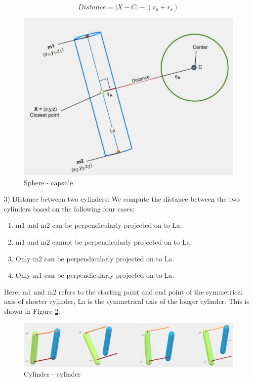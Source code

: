 \documentclass[a4paper, 11.5pt, conference]{ieeeconf}      %
\begin{document}
\begin{equation}
	Distance = |X-C| - (r_a + r_s)
\end{equation}

\begin{figure}[H]
    \centering
    \includegraphics[scale=0.3]{images/sphere_capsule.png}
    \caption{Sphere - capsule}
    \label{fig:spherecapsule}
\end{figure}

3) Distance between two cylinders:
We compute the distance between the two cylinders based on the following four cases:
\begin{enumerate}
	\item m1 and m2 can be perpendicularly projected on to La.
	\item m1 and m2 cannot be perpendicularly projected on to La.
	\item Only m2 can be perpendicularly projected on to La.
	\item Only m1 can be perpendicularly projected on to La.
\end{enumerate}
Here, m1 and m2 refers to the starting point and end point of the symmetrical axis of shorter cylinder, La is the symmetrical axis of the longer cylinder. This is shown in Figure \ref{fig:capsule_capsule}.
\begin{figure}[H]
    \centering
    \includegraphics[scale=0.21]{images/capsule_capsule.png}
    \caption{Cylinder - cylinder}
    \label{fig:capsule_capsule}
\end{figure}
\end{document}

